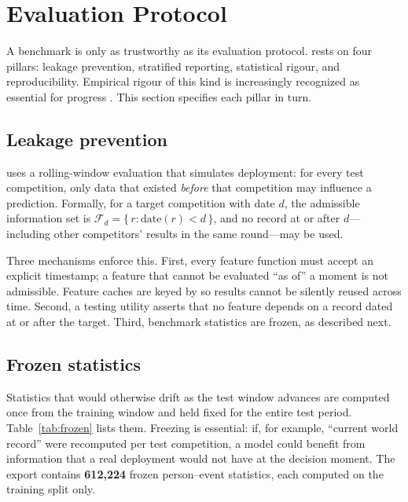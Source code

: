 \section{Evaluation Protocol}
\label{sec:protocol}

A benchmark is only as trustworthy as its evaluation protocol. \wcabench{}
rests on four pillars: leakage prevention, stratified reporting, statistical
rigour, and reproducibility. Empirical rigour of this kind is increasingly
recognized as essential for progress \citep{sculley_rigor}. This section
specifies each pillar in turn.

\subsection{Leakage prevention}
\label{sec:protocol-leakage}

\wcabench{} uses a rolling-window evaluation that simulates deployment: for
every test competition, only data that existed \emph{before} that competition
may influence a prediction. Formally, for a target competition with date $d$,
the admissible information set is
$\mathcal{F}_d = \{\, r : \mathrm{date}(r) < d \,\}$, and no record at or after
$d$---including other competitors' results in the same round---may be used.

Three mechanisms enforce this. First, every feature function must accept an
explicit \asof{} timestamp; a feature that cannot be evaluated ``as of'' a
moment is not admissible. Feature caches are keyed by \asof{} so results cannot
be silently reused across time. Second, a testing utility
 asserts that no feature
depends on a record dated at or after the target. Third, benchmark statistics
are frozen, as described next.

\subsection{Frozen statistics}
\label{sec:protocol-frozen}

Statistics that would otherwise drift as the test window advances are computed
once from the training window and held fixed for the entire test period.
Table~\ref{tab:frozen} lists them. Freezing is essential: if, for example,
``current world record'' were recomputed per test competition, a model could
benefit from information that a real deployment would not have at the decision
moment. The export contains \textbf{612{,}224} frozen person--event
statistics, each computed on the training split only.

